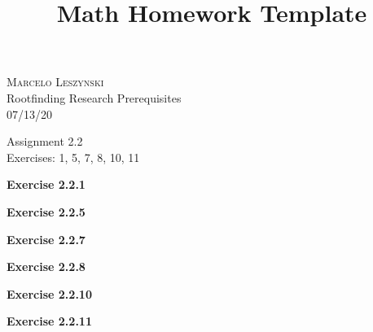 \documentclass[12pt,oneside]{article}
\newenvironment{exercise}[1]{\vspace{.1in}\noindent\textbf{Exercise #1 \hspace{.05em}}}{}
\begin{document}
\title{Math Homework Template}

\begin{flushright}
\textsc{Marcelo Leszynski}  \\
Rootfinding Research Prerequisites\\
07/13/20
\end{flushright}

\begin{center}
\textsf{Assignment 2.2 } \\
\textsf{Exercises: 1, 5, 7, 8, 10, 11 }
\end{center}


\begin{exercise}{2.2.1}

\end{exercise}


\begin{exercise}{2.2.5}

\end{exercise}


\begin{exercise}{2.2.7}

\end{exercise}


\begin{exercise}{2.2.8}

\end{exercise}


\begin{exercise}{2.2.10}

\end{exercise}


\begin{exercise}{2.2.11}

\end{exercise}


\end{document}

